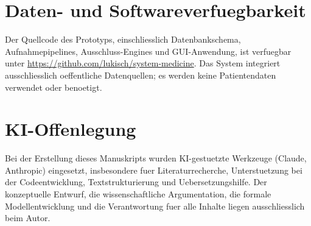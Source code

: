 \documentclass[12pt,a4paper]{article}
\begin{document}
\section*{Daten- und Softwareverfuegbarkeit}

Der Quellcode des Prototyps, einschliesslich Datenbankschema, Aufnahmepipelines, Ausschluss-Engines und GUI-Anwendung, ist verfuegbar unter \url{https://github.com/lukisch/system-medicine}. Das System integriert ausschliesslich oeffentliche Datenquellen; es werden keine Patientendaten verwendet oder benoetigt.

\section*{KI-Offenlegung}

Bei der Erstellung dieses Manuskripts wurden KI-gestuetzte Werkzeuge (Claude, Anthropic) eingesetzt, insbesondere fuer Literaturrecherche, Unterstuetzung bei der Codeentwicklung, Textstrukturierung und Uebersetzungshilfe. Der konzeptuelle Entwurf, die wissenschaftliche Argumentation, die formale Modellentwicklung und die Verantwortung fuer alle Inhalte liegen ausschliesslich beim Autor.
\end{document}
